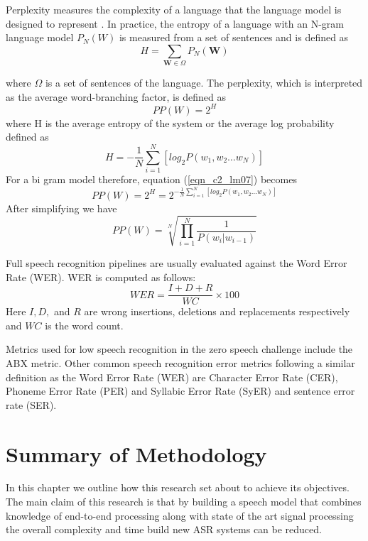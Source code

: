 Perplexity measures the complexity of a language that the language model is designed to represent \citep{1976jelinekcontinuous}. In practice, the entropy of a language with an N-gram language model $P_N(W)$ is measured from a set of sentences and is defined as
\begin{equation}H=\sum_{\mathbf{W}\in\Omega}P_N(\mathbf{W})
\label{eqn_c2_lm05}
\end{equation}

where $\Omega$ is a set of sentences of the language. The perplexity, which is interpreted as the average word-branching factor, is defined as
\begin{equation}PP(W)=2^H
\label{eqn_c2_lm06}
\end{equation}
where H is the average entropy of the system or the average log probability defined as
\begin{equation}
H=-\frac{1}{N}\sum_{i=1}^N[log_2P(w_1,w_2\dots w_N)]
\label{eqn_c2_lm07}
\end{equation}
For a bi gram model therefore, equation (\ref{eqn_c2_lm07}) becomes
\begin{equation}
PP(W)=2^H=2^{-\frac{1}{N}\sum_{i=1}^N[log_2P(w_1,w_2\dots w_N)]}
\label{eqn_c2_lm08}
\end{equation}
After simplifying we have
\begin{equation}
PP(W)=\sqrt[N]{\prod_{i=1}^N\frac{1}{P(w_i|w_{i-1})}}
\label{eqn_c2_lm09}
\end{equation}


Full speech recognition pipelines are usually evaluated against the Word Error Rate (WER).  WER is computed as follows:
\begin{equation}\label{eqn_2_3_wer}
WER=\frac{I+D+R}{WC}\times 100
\end{equation}
Here $I,D,$ and $R$ are wrong insertions, deletions and replacements respectively and $WC$ is the word count.

Metrics used for low speech recognition in the zero speech challenge \citep{versteegh2015zero} include the ABX metric. Other common speech recognition error metrics following a similar definition as the Word Error Rate (WER) are Character Error Rate (CER), Phoneme Error Rate (PER) and Syllabic Error Rate (SyER) and sentence error rate (SER).

\section{Summary of Methodology}
In this chapter we outline how this research set about to achieve its objectives.  The main claim of this research is that by building a speech model that combines knowledge of end-to-end processing along with state of the art signal processing the overall complexity and time build new ASR systems can be reduced.


